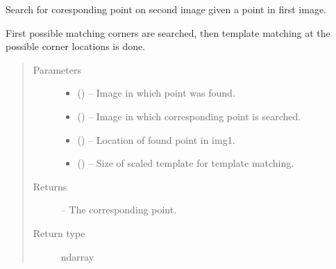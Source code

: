 \documentclass[letterpaper,10pt,english]{sphinxmanual}
\begin{document}
\begin{fulllineitems}
\label{\detokenize{image_sac:image_sac.getCorespondingPoint}}
Search for coresponding point on second image given a point in first image.

First possible matching corners are searched, then template matching at the
possible corner locations is done.
\begin{quote}\begin{description}
\item[{Parameters}] \leavevmode\begin{itemize}
\item {} 
 () -- Image in which point was found.

\item {} 
 () -- Image in which corresponding point is searched.

\item {} 
 () -- Location of found point in img1.

\item {} 
 () -- Size of scaled template for template matching.

\end{itemize}

\item[{Returns}] \leavevmode
{} -- The corresponding point.

\item[{Return type}] \leavevmode
ndarray

\end{description}\end{quote}

\end{fulllineitems}

\end{document}
